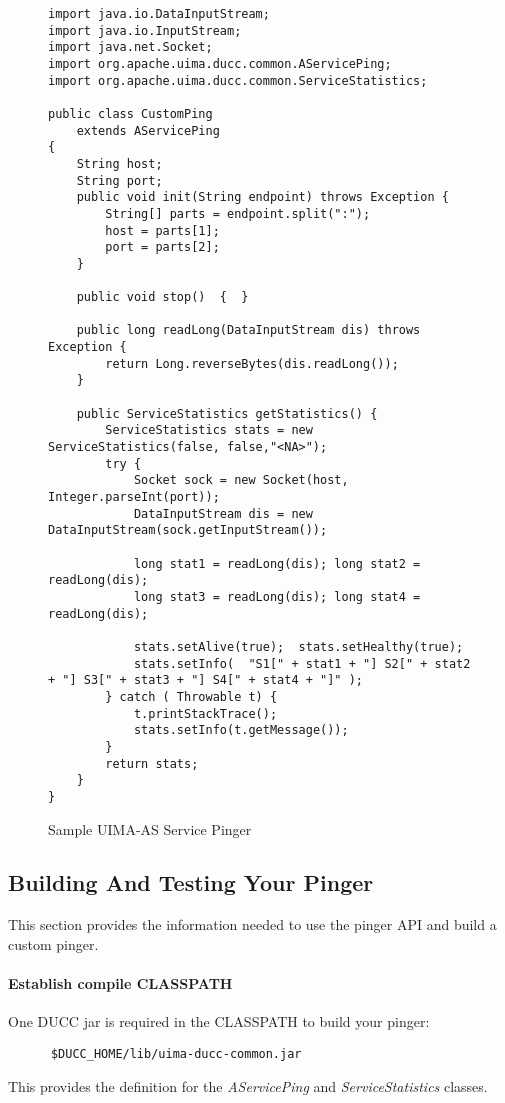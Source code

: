       \begin{figure}[H]
\begin{verbatim}
import java.io.DataInputStream;
import java.io.InputStream;
import java.net.Socket;
import org.apache.uima.ducc.common.AServicePing;
import org.apache.uima.ducc.common.ServiceStatistics;

public class CustomPing
    extends AServicePing
{
    String host;
    String port;
    public void init(String endpoint) throws Exception {
        String[] parts = endpoint.split(":");
        host = parts[1];
        port = parts[2];
    }

    public void stop()  {  }

    public long readLong(DataInputStream dis) throws Exception {
        return Long.reverseBytes(dis.readLong());
    }

    public ServiceStatistics getStatistics() {
        ServiceStatistics stats = new ServiceStatistics(false, false,"<NA>");
        try {
            Socket sock = new Socket(host, Integer.parseInt(port));
            DataInputStream dis = new DataInputStream(sock.getInputStream());

            long stat1 = readLong(dis); long stat2 = readLong(dis); 
            long stat3 = readLong(dis); long stat4 = readLong(dis);

            stats.setAlive(true);  stats.setHealthy(true);
            stats.setInfo(  "S1[" + stat1 + "] S2[" + stat2 + "] S3[" + stat3 + "] S4[" + stat4 + "]" );
        } catch ( Throwable t) {
        	t.printStackTrace();
            stats.setInfo(t.getMessage());
        }
        return stats;        
    }
}
\end{verbatim}
        \caption{Sample UIMA-AS Service Pinger}
        \label{fig:service.custom.pinger}

      \end{figure}
      
      \subsection{Building And Testing Your Pinger}
      This section provides the information needed to use the pinger API and build a
      custom pinger. 

      \paragraph{Establish compile CLASSPATH} One DUCC jar is required in the CLASSPATH to build your pinger:
\begin{verbatim}
      $DUCC_HOME/lib/uima-ducc-common.jar
\end{verbatim}      
      This provides the definition for the {\em AServicePing} and {\em ServiceStatistics} classes.

